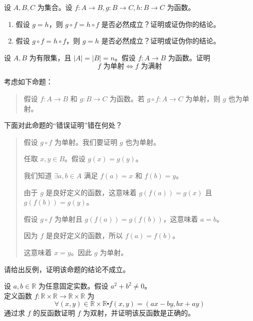 \begin{exercise}
    设 $A,B,C$ 为集合。设 $f : A \to B, g : B \to C, h : B \to C$ 为函数。
    \begin{enumerate}[label=(\alph*)]
        \item 假设 $g = h$，则 $g \circ f = h \circ f$ 是否必然成立？证明或证伪你的结论。
        \item 假设 $g \circ f = h \circ f$，则 $g = h$ 是否必然成立？证明或证伪你的结论。
    \end{enumerate}
\end{exercise}

\begin{exercise}
    设 $A, B$ 为有限集，且 $|A| = |B| = n$。假设 $f : A \to B$ 为函数。证明
    \[f \text{ 为单射} \iff f \text{ 为满射}\]
\end{exercise}

\begin{exercise}
    考虑如下命题：
    \begin{quote}
        假设 $f : A \to B$ 和 $g : B \to C$ 为函数。若 $g \circ f : A \to C$ 为单射，则 $g$ 也为单射。
    \end{quote}
    下面对此命题的``错误证明''错在何处？
    \begin{quote}
        \begin{spoof}
            假设 $g \circ f$ 为单射。我们要证明 $g$ 也为单射。

            任取 $x, y \in B$。假设 $g(x) = g(y)$。

            我们知道 $\exists a,b \in A$ 满足 $f(a) = x$ 和 $f(b) = y$。

            由于 $g$ 是良好定义的函数，这意味着 $g(f(a)) = g(x)$ 且 $g(f(b)) = g(y)$。

            假设 $g \circ f$ 为单射且 $g(f(a)) = g(f(b))$，这意味着 $a = b$。

            因为 $f$ 是良好定义的函数，所以 $f(a) = f(b)$。

            这意味着 $x = y$。因此 $g$ 为单射。
        \end{spoof}
    \end{quote}
    请给出反例，证明该命题的结论不成立。
\end{exercise}

\begin{exercise}
    设 $a, b \in \mathbb{R}$ 为任意固定实数。假设 $a^2 + b^2 \ne 0$。\\
    定义函数 $f : \mathbb{R} \times \mathbb{R} \to \mathbb{R} \times \mathbb{R}$ 为
    \[\forall (x, y) \in \mathbb{R} \times \mathbb{R} \centerdot f(x, y) = (ax - by, bx + ay)\]
    通过求 $f$ 的反函数证明 $f$ 为双射，并证明该反函数是正确的。
\end{exercise}

